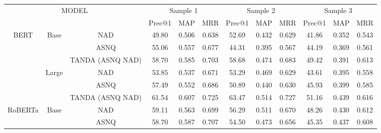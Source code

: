 \documentclass[letterpaper]{article} \usepackage{aaai20}  \usepackage{times}  \usepackage{helvet} \usepackage{courier}  \usepackage[hyphens]{url}  \usepackage{graphicx} \urlstyle{rm} \def\UrlFont{\rm}  \usepackage{graphicx}  \usepackage{todonotes}
\begin{document}
\begin{table*}[h]
\begin{small}
\center
\begin{tabular}{|c|c|c|c|c|c|c|c|c|c|c|c|}
\hline
\multicolumn{3}{|c|}{\multirow{2}{*}{MODEL}}                                        & \multicolumn{3}{c|}{Sample 1} & \multicolumn{3}{c|}{Sample 2} & \multicolumn{3}{c|}{Sample 3} \\ \cline{4-12} 
\multicolumn{3}{|c|}{}                                                              & Prec@1      & MAP        & MRR        & Prec@1       & MAP         & MRR         & Prec@1        & MAP          & MRR         \\ \hline
\multirow{6}{*}{BERT}    & \multirow{3}{*}{Base}  & NAD                            & 49.80       & 0.506      & 0.638      & 52.69        & 0.432       & 0.629       & 41.86         & 0.352        & 0.543       \\ \cline{3-12} 
                         &                        & ASNQ                            & 55.06       & 0.557      & 0.677      & 44.31        & 0.395       & 0.567       & 44.19         & 0.369        & 0.561       \\ \cline{3-12} 
                         &                        & TANDA (ASNQ  NAD) & 58.70        & 0.585      & 0.703      & 58.68        & 0.474       & 0.683       & 49.42         & 0.391        & 0.613       \\ \cline{2-12} 
                         & \multirow{3}{*}{Large} & NAD                            & 53.85       & 0.537      & 0.671      & 53.29        & 0.469       & 0.629       & 43.61         & 0.395        & 0.558       \\ \cline{3-12} 
                         &                        & ASNQ                            & 57.49       & 0.552      & 0.686      & 50.89        & 0.440       & 0.630       & 45.93         & 0.399        & 0.585       \\ \cline{3-12} 
                         &                        & TANDA (ASNQ  NAD) & 61.54       & 0.607      & 0.725      & 63.47        & 0.514       & 0.727       & 51.16         & 0.439        & 0.616       \\ \hline
\multirow{6}{*}{RoBERTa} & \multirow{3}{*}{Base}  & NAD                            & 59.11       & 0.563      & 0.699      & 56.29        & 0.511       & 0.670       & 48.26         & 0.430        & 0.612       \\ \cline{3-12} 
                         &                        & ASNQ                            & 58.70       & 0.587      & 0.707      & 54.50        & 0.473       & 0.656       & 45.35         & 0.437        & 0.608       \\ \cline{3-12} 

\end{tabular}
\end{small}
\end{table*}
\end{document}
